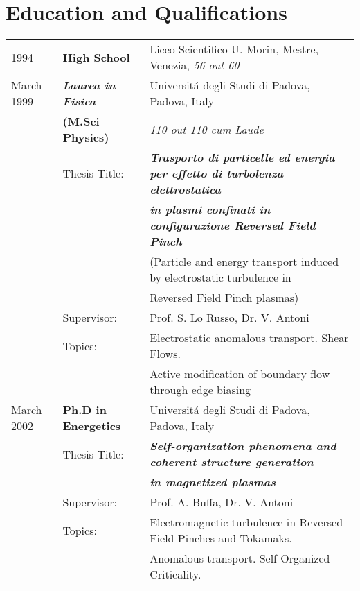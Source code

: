 \section{Education and Qualifications}
\begin{tabular}{lll}
1994 & \textbf{ High School} & Liceo Scientifico U. Morin, Mestre, Venezia,
\textit{56 out 60}\\
March 1999 & \textbf{\textit{Laurea in Fisica} } &
Universit\'a degli Studi di Padova, Padova, Italy \\
 & \textbf{(M.Sci Physics)} & \textit{110 out 110 cum Laude} \\
 &Thesis Title:  & \textbf{\emph{Trasporto di particelle ed energia per effetto
 di turbolenza elettrostatica}} \\
& & \textbf{\emph{in plasmi confinati in configurazione
 Reversed Field Pinch}} \\ 
& & (Particle and energy transport induced by
electrostatic turbulence in \\
& &  Reversed Field Pinch  plasmas) \\ 
& Supervisor: & Prof. S. Lo Russo, Dr. V. Antoni \\
 & Topics: & Electrostatic anomalous transport. Shear Flows. \\ 
& & Active
 modification of boundary flow through edge biasing \\
 March 2002 & \textbf{Ph.D in Energetics} & Universit\'a degli Studi di Padova, Padova,
Italy \\
& Thesis Title: & \textbf{\emph{Self-organization phenomena and
    coherent structure generation}} \\
 & & \textbf{\emph{in magnetized plasmas}} \\
 & Supervisor: & Prof. A. Buffa, Dr. V. Antoni \\ 
 & Topics: & Electromagnetic turbulence in Reversed Field Pinches and Tokamaks. \\
& & Anomalous transport. Self Organized Criticality.
\end{tabular}
